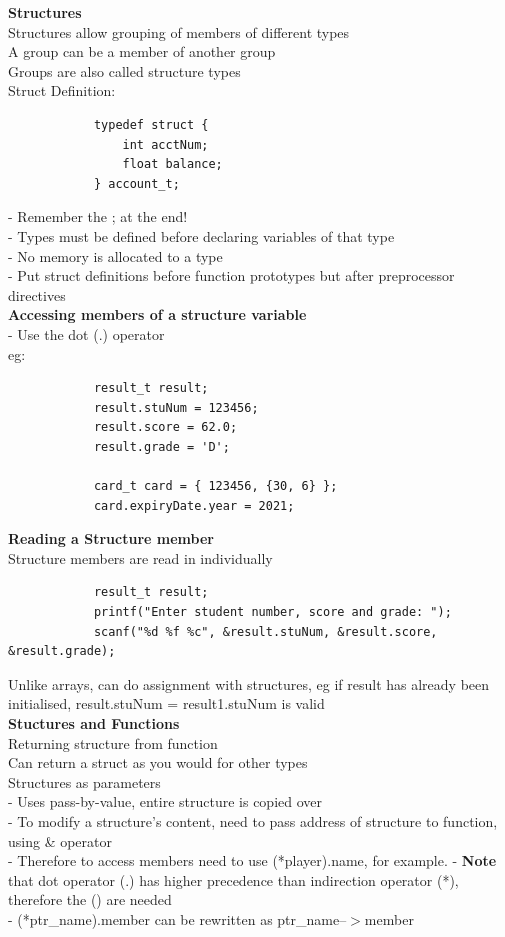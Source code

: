 \documentclass[10pt, a4paper]{article}
\newcommand{\highlight}[1]{{\color{red}\textbf{#1}}}
\begin{document}
\begin{multicols*}{3}
		\textbf{Structures}\\
		Structures allow grouping of members of different types\\
		A group can be a member of another group\\
		Groups are also called structure types\\
		
		Struct Definition:
		\begin{verbatim}
			typedef struct {
			    int acctNum;
			    float balance;
			} account_t;
		\end{verbatim}
		- Remember the ; at the end!\\
		- Types must be defined before declaring variables of that type\\
		- No memory is allocated to a type\\
		- Put struct definitions before function prototypes but after preprocessor directives\\
		
		\textbf{Accessing members of a structure variable}\\
		- Use the dot (.) operator\\
		eg:
		\begin{verbatim}
			result_t result;
			result.stuNum = 123456;
			result.score = 62.0;
			result.grade = 'D';
			
			card_t card = { 123456, {30, 6} };
			card.expiryDate.year = 2021;
		\end{verbatim}
		
		\textbf{Reading a Structure member}\\
		Structure members are read in individually
		\begin{verbatim}
			result_t result;
			printf("Enter student number, score and grade: ");
			scanf("%d %f %c", &result.stuNum, &result.score, &result.grade);
		\end{verbatim}
		Unlike arrays, can do assignment with structures, eg if result has already been initialised, result.stuNum = result1.stuNum is valid\\
		
		\textbf{Stuctures and Functions}\\
		
		Returning structure from function\\
		Can return a struct as you would for other types\\
		
		Structures as parameters\\
		- Uses pass-by-value, entire structure is copied over\\
		- To modify a structure's content, need to pass address of structure to function, using \& operator\\
		- Therefore to access members need to use (*player).name, for example. 
		- \highlight{Note} that dot operator (.) has higher precedence than indirection operator (*), therefore the () are needed\\
		- (*ptr\_name).member can be rewritten as ptr\_name--$>$member\\
		

\end{multicols*}
\end{document}
